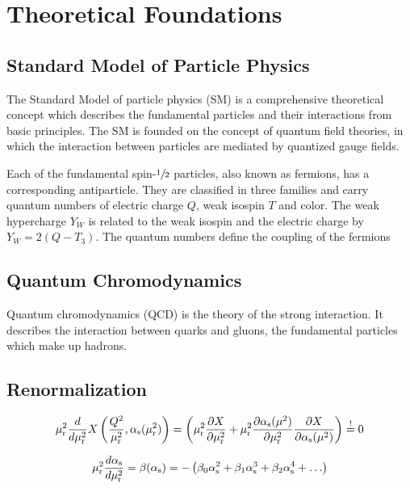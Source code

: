 
\chapter{Theoretical Foundations}

\section{Standard Model of Particle Physics}

The Standard Model of particle physics (SM) is a comprehensive theoretical
concept which describes the fundamental particles and their interactions from
basic principles. The SM is founded on the concept of quantum field theories, in
which the interaction between particles are mediated by quantized gauge fields.

Each of the fundamental spin-$\sfrac{1}{2}$ particles, also known as fermions,
has a corresponding antiparticle. They are classified in three families and
carry quantum numbers of electric charge $Q$, weak isospin $T$ and color. The
weak hypercharge $Y_W$ is related to the weak isospin and the electric charge by
$Y_W = 2(Q-T_3)$. The quantum numbers define the coupling of the fermions

\section{Quantum Chromodynamics}

Quantum chromodynamics (QCD) is the theory of the strong interaction. It
describes the interaction between quarks and gluons, the fundamental particles
which make up hadrons.

\section{Renormalization}

\begin{equation} 
    \mu_{\mathrm{r}}^2 \frac{d}{d \mu_{\mathrm{r}}^2} X \left(\frac{Q^2}{\mu_{\mathrm{r}}^2},\alpha_\mathrm{s}(\mu_{\mathrm{r}}^2)\right) = \left(
    \mu_{\mathrm{r}}^2 \frac{\partial X}{\partial \mu_{\mathrm{r}}^2} + \mu_{\mathrm{r}}^2 \frac{\partial
    \alpha_\mathrm{s}(\mu^2)}{\partial \mu_{\mathrm{r}}^2} \frac{\partial X}{\partial \alpha_\mathrm{s}(\mu^2)} \right) \stackrel{!}{=} 0 
\end{equation}


\begin{equation}
    \mu_{\mathrm{r}}^2 \frac{d \alpha_\mathrm{s}}{d \mu_{\mathrm{r}}^2} = \beta(\alpha_\mathrm{s}) = - \left( \beta_0 \alpha_\mathrm{s}^2 + \beta_1 \alpha_\mathrm{s}^3
    + \beta_2 \alpha_\mathrm{s}^4 + \ldots \right)
\end{equation}

